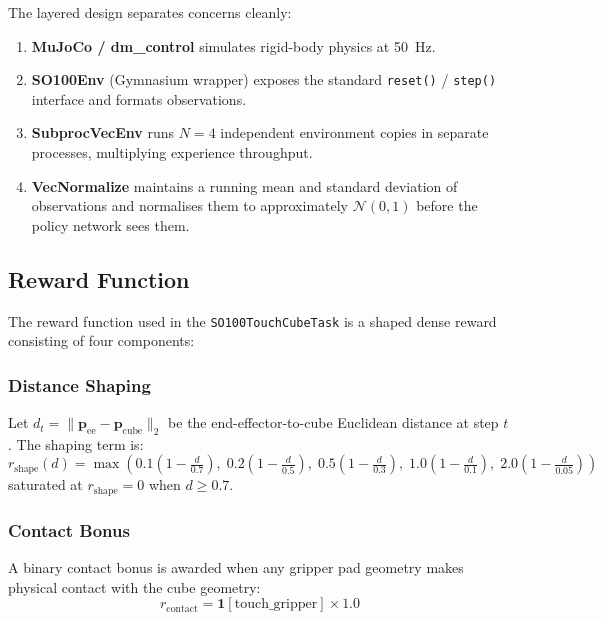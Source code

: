 \documentclass[conference]{IEEEtran}
\begin{document}
The layered design separates concerns cleanly:
\begin{enumerate}
    \item \textbf{MuJoCo / dm\_control} simulates rigid-body physics
          at 50~Hz.
    \item \textbf{SO100Env} (Gymnasium wrapper) exposes the
          standard \texttt{reset()} / \texttt{step()} interface and
          formats observations.
    \item \textbf{SubprocVecEnv} runs $N=4$ independent environment
          copies in separate processes, multiplying experience throughput.
    \item \textbf{VecNormalize} maintains a running mean and standard
          deviation of observations and normalises them to
          approximately $\mathcal{N}(0,1)$ before the policy network
          sees them.
\end{enumerate}

\subsection{Reward Function}
\label{sec:reward}

The reward function used in the \texttt{SO100TouchCubeTask} is a
shaped dense reward consisting of four components:

\subsubsection{Distance Shaping}

Let $d_t = \|\mathbf{p}_\text{ee} - \mathbf{p}_\text{cube}\|_2$
be the end-effector-to-cube Euclidean distance at step $t$.
The shaping term is:
\begin{equation}
    r_\text{shape}(d) =
    \max \left(
        0.1\!\left(1-\tfrac{d}{0.7}\right),\;
        0.2\!\left(1-\tfrac{d}{0.5}\right),\;
        0.5\!\left(1-\tfrac{d}{0.3}\right),\;
        1.0\!\left(1-\tfrac{d}{0.1}\right),\;
        2.0\!\left(1-\tfrac{d}{0.05}\right)
    \right)
    \label{eq:shape}
\end{equation}
saturated at $r_\text{shape} = 0$ when $d \geq 0.7$.

\subsubsection{Contact Bonus}

A binary contact bonus is awarded when any gripper pad geometry
makes physical contact with the cube geometry:
\begin{equation}
    r_\text{contact} = \mathbf{1}[\text{touch\_gripper}] \times 1.0
\end{equation}
\end{document}
